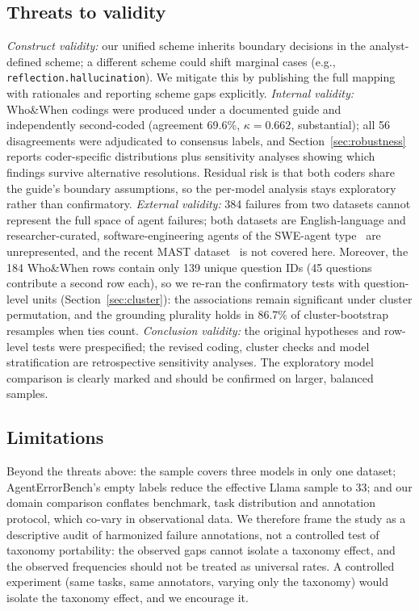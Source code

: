 \documentclass[12pt,letterpaper]{article}
\begin{document}
\subsection{Threats to validity}
\label{sec:threats}
\emph{Construct validity:} our unified scheme inherits boundary decisions
in the analyst-defined scheme; a different scheme could shift marginal cases
(e.g., \texttt{reflection.hallucination}). We mitigate this by publishing the
full mapping with rationales and reporting scheme gaps explicitly.
\emph{Internal validity:} Who\&When codings were produced under a documented
guide and independently second-coded (agreement 69.6\%, $\kappa=0.662$,
substantial); all 56 disagreements were adjudicated to consensus labels, and
Section~\ref{sec:robustness} reports coder-specific distributions plus sensitivity analyses
showing which findings survive alternative resolutions. Residual risk is that
both coders share the guide's boundary assumptions, so the per-model analysis
stays exploratory rather than
confirmatory. \emph{External validity:} 384 failures from two datasets
cannot represent the full space of agent failures; both datasets are
English-language and researcher-curated, software-engineering agents of
the SWE-agent type~\cite{yang2024sweagent} are unrepresented, and the
recent MAST dataset~\cite{cemri2025mast} is not covered here. Moreover,
the 184 Who\&When rows contain only 139 unique question IDs (45 questions
contribute a second row each), so we re-ran the confirmatory tests with
question-level units (Section~\ref{sec:cluster}): the associations remain
significant under cluster permutation, and the grounding plurality holds in
86.7\% of cluster-bootstrap resamples when ties count. \emph{Conclusion
validity:} the original hypotheses and row-level tests were prespecified; the
revised coding, cluster checks and model stratification are retrospective
sensitivity analyses. The exploratory model
comparison is clearly marked and should be confirmed on larger, balanced
samples.

\subsection{Limitations}
\label{sec:limitations}
Beyond the threats above: the sample covers three models in only one
dataset; AgentErrorBench's empty labels reduce the effective Llama sample to
33; and our domain comparison conflates benchmark, task distribution and
annotation protocol, which co-vary in observational data. We therefore frame
the study as a descriptive audit of harmonized failure annotations, not a
controlled test of taxonomy portability: the observed gaps cannot isolate a
taxonomy effect, and the observed frequencies should not be treated as universal rates. A controlled
experiment (same tasks, same annotators, varying only the taxonomy) would
isolate the taxonomy effect, and we encourage it.
\end{document}
